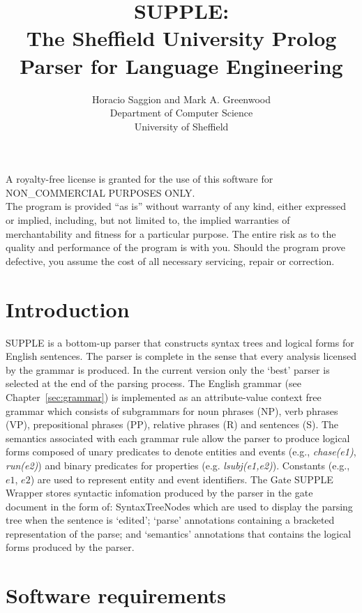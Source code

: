 \documentclass[a4paper,titlepage,openany,twoside]{book}
\title{SUPPLE:\\The Sheffield University Prolog Parser for Language Engineering}
\author{Horacio Saggion and Mark A. Greenwood\\
Department of Computer Science\\University of Sheffield}
\begin{document}
\maketitle


{\huge A royalty-free license is granted for the use of this software for
NON\_COMMERCIAL PURPOSES ONLY.\\

The program is provided ``as is'' without warranty of any kind, either
expressed or implied, including, but not limited to, the implied
warranties of merchantability and fitness for a particular purpose.
The entire risk as to the quality and performance of the program is
with you.  Should the program prove defective, you assume the cost of
all necessary servicing, repair or correction.}

\chapter{Introduction}


SUPPLE is a bottom-up  parser that constructs syntax trees and
logical forms for English sentences. The parser is complete in the
sense that every analysis licensed by the grammar is produced. In the
current version only the `best' parser is selected at the end of the
parsing process. The English grammar (see Chapter~\ref{sec:grammar}) is implemented as an
attribute-value 
context free grammar which consists of subgrammars for  noun phrases (NP), verb phrases (VP), prepositional 
phrases (PP), relative phrases (R) and sentences (S). The semantics
 associated with each grammar rule allow the parser to produce logical
forms composed of unary predicates to denote  entities and
events (e.g., {\em chase(e1)},  {\em run(e2)}) and binary predicates
for properties  (e.g. {\em lsubj(e1,e2)}). Constants (e.g., $e1$,
$e2$) are used to represent entity and event identifiers.
The Gate SUPPLE Wrapper stores syntactic infomation produced by the
parser
in the gate document in the form of: SyntaxTreeNodes which are used to
display the parsing tree when the sentence is `edited'; `parse'
annotations containing a bracketed representation of the parse; and
`semantics' annotations that contains the logical forms produced by
the parser.  




\chapter{Software requirements}
\end{document}

